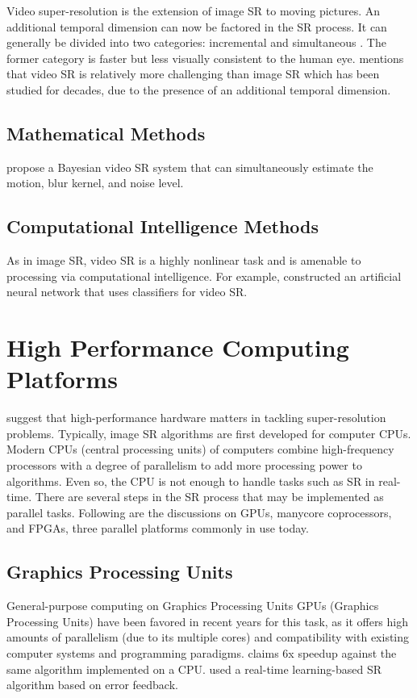 Video super-resolution is the extension of image SR to moving pictures.
An additional temporal dimension can now be factored in the SR process.
It can generally be divided into two categories: incremental and simultaneous \citep{Su2011}.
The former category is faster but less visually consistent to the human eye.
\cite{Liu2014} mentions that video SR is relatively more challenging than image SR which has been studied for decades, due to the presence of an additional temporal dimension.


\subsection{Mathematical Methods}

\cite{Liu2014} propose a Bayesian video SR system that can simultaneously estimate the motion, blur kernel, and noise level.


\subsection{Computational Intelligence Methods}
As in image SR, video SR is a highly nonlinear task and is amenable to processing via computational intelligence. 
For example, \cite{Cheng2013} constructed an artificial neural network that uses classifiers for video SR.

\section{High Performance Computing Platforms}
\cite{Yang2010a} suggest that high-performance hardware matters in tackling super-resolution problems. 
Typically, image SR algorithms are first developed for computer CPUs.
Modern CPUs (central processing units) of computers combine high-frequency processors with a degree of parallelism to add more processing power to algorithms.
Even so, the CPU is not enough to handle tasks such as SR in real-time.
There are several steps in the SR process that may be implemented as parallel tasks.
Following are the discussions on GPUs, manycore coprocessors, and FPGAs, three parallel platforms commonly in use today.

\subsection{Graphics Processing Units}
General-purpose computing on Graphics Processing Units
GPUs (Graphics Processing Units) have been favored in recent years for this task, as it offers high amounts of parallelism (due to its multiple cores) and compatibility with existing computer systems and programming paradigms.
\cite{Wu2011} claims 6x speedup against the same algorithm implemented on a CPU. 
\cite{Shen2014} used a real-time learning-based SR algorithm based on error feedback. 


